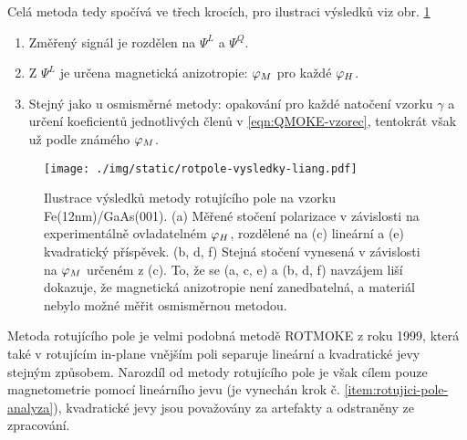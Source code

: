 Celá metoda tedy spočívá ve třech krocích, pro ilustraci výsledků viz obr. \ref{fig:metoda-rotujiciho-pole-vysledky}
\begin{enumerate}
    \item Změřený signál je rozdělen na $\Psi^L$ a $\Psi^Q$.
    \item Z $\Psi^L$ je určena magnetická anizotropie: $\varphi_M$ pro každé $\varphi_H$.
    \item Stejný jako u osmisměrné metody: opakování pro každé natočení vzorku $\gamma$ a určení koeficientů jednotlivých členů v \eqref{eqn:QMOKE-vzorec}, tentokrát však už podle známého $\varphi_M$. \label{item:rotujici-pole-analyza}
\end{enumerate}

\begin{figure}[htbp]
    \centering
    \texttt{[image: ./img/static/rotpole-vysledky-liang.pdf]}
    \caption{Ilustrace výsledků metody rotujícího pole na vzorku Fe(12nm)/GaAs(001).
    (a) Měřené stočení polarizace v závislosti na experimentálně ovladatelném $\varphi_H$, rozdělené na (c) lineární a (e) kvadratický příspěvek. (b, d, f) Stejná stočení vynesená v závislosti na $\varphi_M$ určeném z (c). 
    To, že se (a, c, e) a (b, d, f) navzájem liší dokazuje, že magnetická anizotropie není zanedbatelná, a materiál nebylo možné měřit osmisměrnou metodou. \cite{liangSeparationLinearQuadratic2015}}
    \label{fig:metoda-rotujiciho-pole-vysledky}
\end{figure}

Metoda rotujícího pole je velmi podobná metodě ROTMOKE\cite{mattheisDeterminationAnisotropyField1999} z roku 1999, která také v rotujícím in-plane vnějším poli separuje lineární a kvadratické jevy stejným způsobem.
Narozdíl od metody rotujícího pole je však cílem pouze magnetometrie pomocí lineárního jevu (je vynechán krok č. \ref{item:rotujici-pole-analyza}), kvadratické jevy jsou považovány za artefakty a odstraněny ze zpracování.
